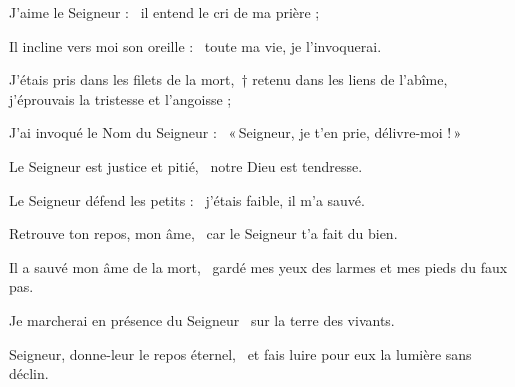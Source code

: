 \item J'aime le Seigneur :~\psstar{} il entend le cri de ma prière ;

\item Il incline vers moi son oreille :~\psstar{} toute ma vie, je l'invoquerai.

\item J'étais pris dans les filets de la mort,~† retenu dans les liens de l'abîme,~\psstar{} j'éprouvais la tristesse et l'angoisse ;

\item J'ai invoqué le Nom du Seigneur :~\psstar{} «\,Seigneur, je t'en prie, délivre-moi !\,»

\item Le Seigneur est justice et pitié,~\psstar{} notre Dieu est tendresse.

\item Le Seigneur défend les petits :~\psstar{} j'étais faible, il m'a sauvé.

\item Retrouve ton repos, mon âme,~\psstar{} car le Seigneur t'a fait du bien.

\item Il a sauvé mon âme de la mort,~\psstar{} gardé mes yeux des larmes et mes pieds du faux pas.

\item Je marcherai en présence du Seigneur~\psstar{} sur la terre des vivants.

\item Seigneur, donne-leur le repos éternel,~\psstar{} et fais luire pour eux la lumière sans déclin.